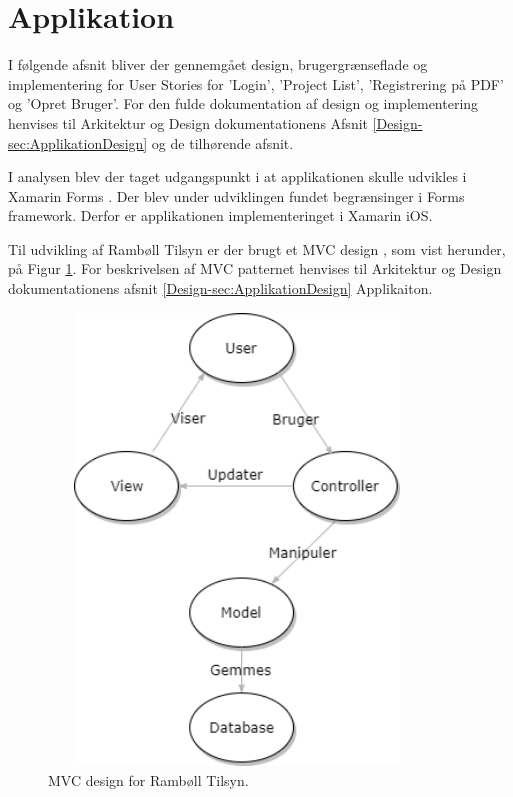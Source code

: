 \section{Applikation}
I følgende afsnit bliver der gennemgået design, brugergrænseflade og implementering for User Stories for 'Login', 'Project List', 'Registrering på PDF' og 'Opret Bruger'. For den fulde dokumentation af design og implementering henvises til Arkitektur og Design dokumentationens Afsnit \ref{Design-sec:ApplikationDesign} og de tilhørende afsnit.

I analysen blev der taget udgangspunkt i at applikationen skulle udvikles i Xamarin Forms \cite{Forms}. Der blev under udviklingen fundet begrænsinger i Forms framework. Derfor er applikationen implementeringet i Xamarin iOS.

Til udvikling af Rambøll Tilsyn er der brugt et MVC design \cite{MVC}, som vist herunder, på Figur \ref{fig:MVC}. For beskrivelsen af MVC patternet henvises til Arkitektur og Design dokumentationens afsnit \ref{Design-sec:ApplikationDesign} Applikaiton.
\begin{figure}[H] %
	\centering
	\includegraphics[height=12cm, width=10cm]{Design/Applikation/MVC}
	\caption{MVC design for Rambøll Tilsyn.}
	\label{fig:MVC}
\end{figure}

\clearpage





